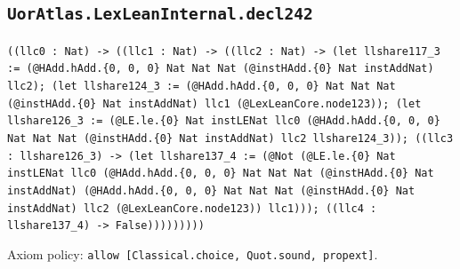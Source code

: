 \documentclass[11pt]{article}
\begin{document}
\subsection*{\texttt{UorAtlas.LexLeanInternal.decl242}}
\noindent\texttt{((llc0 : Nat) -> ((llc1 : Nat) -> ((llc2 : Nat) -> (let llshare117\_3 := (@HAdd.hAdd.\{0, 0, 0\} Nat Nat Nat (@instHAdd.\{0\} Nat instAddNat) llc2); (let llshare124\_3 := (@HAdd.hAdd.\{0, 0, 0\} Nat Nat Nat (@instHAdd.\{0\} Nat instAddNat) llc1 (@LexLeanCore.node123)); (let llshare126\_3 := (@LE.le.\{0\} Nat instLENat llc0 (@HAdd.hAdd.\{0, 0, 0\} Nat Nat Nat (@instHAdd.\{0\} Nat instAddNat) llc2 llshare124\_3)); ((llc3 : llshare126\_3) -> (let llshare137\_4 := (@Not (@LE.le.\{0\} Nat instLENat llc0 (@HAdd.hAdd.\{0, 0, 0\} Nat Nat Nat (@instHAdd.\{0\} Nat instAddNat) (@HAdd.hAdd.\{0, 0, 0\} Nat Nat Nat (@instHAdd.\{0\} Nat instAddNat) llc2 (@LexLeanCore.node123)) llc1))); ((llc4 : llshare137\_4) -> False)))))))))}\par
\noindent Axiom policy: \texttt{allow [Classical.choice, Quot.sound, propext]}.\par
\end{document}
